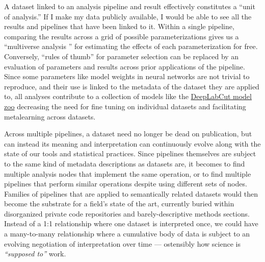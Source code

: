 A dataset linked to an analysis pipeline and result effectively
constitutes a ``unit of analysis.'' If I make my data publicly
available, I would be able to see all the results and pipelines that
have been linked to it. Within a single pipeline, comparing the results
across a grid of possible parameterizations gives us a ``multiverse
analysis \citep{steegenIncreasingTransparencyMultiverse2016} ''
for estimating the effects of each parameterization for free.
Conversely, ``rules of thumb'' for parameter selection can be replaced
by an evaluation of parameters and results across prior applications of
the pipeline. Since some parameters like model weights in neural
networks are not trivial to reproduce, and their use is linked to the
metadata of the dataset they are applied to, all analyses contribute to
a collection of models like the
\href{http://www.mackenziemathislab.org/dlc-modelzoo}{DeepLabCut model
zoo} decreasing the need for fine tuning on individual datasets and
facilitating metalearning across datasets.

Across multiple pipelines, a dataset need no longer be dead on
publication, but can instead its meaning and interpretation can
continuously evolve along with the state of our tools and statistical
practices. Since pipelines themselves are subject to the same kind of
metadata descriptions as datasets are, it becomes to find multiple
analysis nodes that implement the same operation, or to find multiple
pipelines that perform similar operations despite using different sets
of nodes. Families of pipelines that are applied to semantically related
datasets would then become the substrate for a field's state of the art,
currently buried within disorganized private code repositories and
barely-descriptive methods sections. Instead of a 1:1 relationship where
one dataset is interpreted once, we could have a many-to-many
relationship where a cumulative body of data is subject to an evolving
negotiation of interpretation over time --- ostensibly how science is
\emph{``supposed to''} work.

